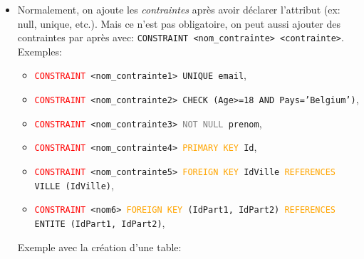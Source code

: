 \documentclass[a4paper]{article}
\begin{document}
\begin{itemize}
\item Normalement, on ajoute les \textit{contraintes} après avoir déclarer l'attribut (ex: null, unique, etc.). Mais ce n'est pas obligatoire, on peut aussi ajouter des contraintes par après avec: \texttt{CONSTRAINT <nom\_contrainte> <contrainte>}. \\
Exemples:
\begin{itemize}
    \item \texttt{\textcolor{red}{CONSTRAINT} <nom\_contrainte1> UNIQUE email},
    \item \texttt{\textcolor{red}{CONSTRAINT} <nom\_contrainte2> \texttt{CHECK} (Age>=18 AND Pays='Belgium')},
    \item \texttt{\textcolor{red}{CONSTRAINT} <nom\_contrainte3> \texttt{\textcolor{gray}{NOT NULL}} prenom},
    \item \texttt{\textcolor{red}{CONSTRAINT} <nom\_contrainte4> \texttt{\textcolor{orange}{PRIMARY KEY}} Id},
    \item \texttt{\textcolor{red}{CONSTRAINT} <nom\_contrainte5> \texttt{\textcolor{orange}{FOREIGN KEY}} IdVille \texttt{\textcolor{orange}{REFERENCES}} VILLE (IdVille)},
    \item \texttt{\textcolor{red}{CONSTRAINT} <nom6> \texttt{\textcolor{orange}{FOREIGN KEY}} (IdPart1, IdPart2) \texttt{\textcolor{orange}{REFERENCES}} ENTITE (IdPart1, IdPart2)},
\end{itemize}


Exemple avec la création d'une table:
\begin{center}
\end{center}



\end{itemize}
\end{document}
